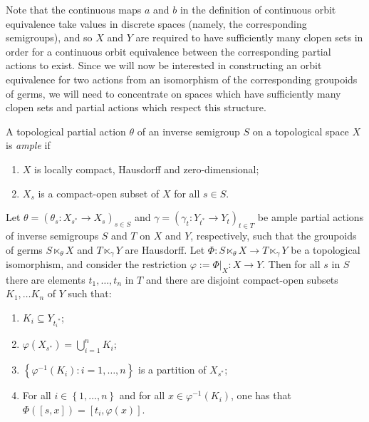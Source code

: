 Note that the continuous maps $a$ and $b$ in the definition of continuous orbit equivalence take values in discrete spaces (namely, the corresponding semigroups), and so $X$ and $Y$ are required to have sufficiently many clopen sets in order for a continuous orbit equivalence between the corresponding partial actions to exist. Since we will now be interested in constructing an orbit equivalence for two actions from an isomorphism of the corresponding groupoids of germs, we will need to concentrate on spaces which have sufficiently many clopen sets and partial actions which respect this structure.

\begin{definition}[{\cite[Definition~5.2]{MR2565546}}]
A topological partial action $\theta$ of an inverse semigroup $S$ on a topological space $X$ is \emph{ample} if
\begin{enumerate}
\item[(i)] $X$ is locally compact, Hausdorff and zero-dimensional;
\item[(ii)] $X_s$ is a compact-open subset of $X$ for all $s\in S$.
\end{enumerate}
\end{definition}

\begin{lemma}\label{lemmaisomorphismtocoe}
Let $\theta=\left(\theta_s:X_{s^*}\to X_s\right)_{s\in S}$ and $\gamma=\left(\gamma_t:Y_{t^*}\to Y_t\right)_{t\in T}$ be ample partial actions of inverse semigroups $S$ and $T$ on $X$ and $Y$, respectively, such that the groupoids of germs $S\ltimes_\theta X$ and $T\ltimes_\gamma Y$ are Hausdorff. Let $\Phi: S \ltimes_\theta X \rightarrow T \ltimes_\gamma Y$ be a topological isomorphism, and consider the restriction $\varphi:=\Phi|_X:X\to Y$. Then for all $s$ in $S$ there are elements $t_1, \ldots, t_n$ in $T$ and there are disjoint compact-open subsets $K_1, \ldots K_n$ of $Y$ such that:
\begin{enumerate}
\item[(a)] $K_i \subseteq Y_{{t_i}^*}$;
\item[(b)] $\varphi(X_{s^*})=\bigcup_{i=1}^nK_i$;
\item[(c)] $\left\{\varphi^{-1}(K_i):i=1,\ldots,n\right\}$ is a partition of $X_{s^*}$;
\item[(d)] For all $i\in\left\{1,\ldots,n\right\}$ and for all $x \in \varphi^{-1}(K_i)$, one has that $\Phi([s,x])=[t_i,\varphi(x)]$.
\end{enumerate}
\end{lemma}


